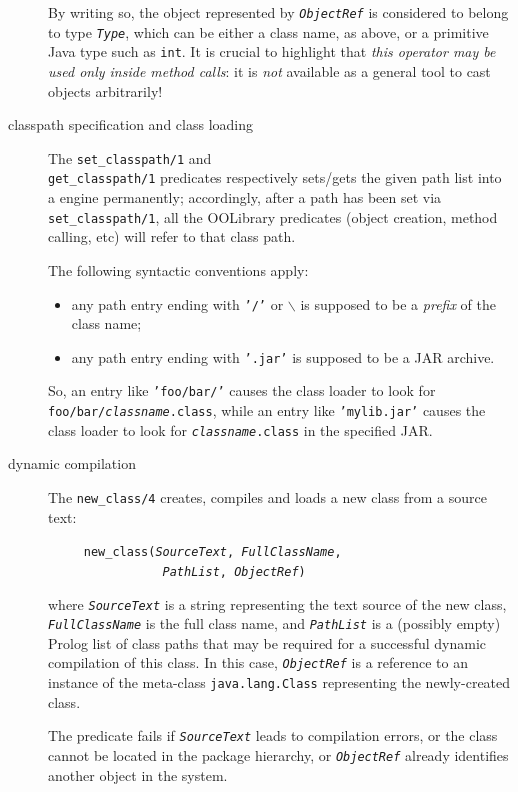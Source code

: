 \begin{description}
        By writing so, the object represented by \texttt{\textit{ObjectRef}} is considered to belong to type \texttt{\textit{Type}}, which can be either a class name, as above, or a primitive Java type such as \texttt{int}.
        It is crucial to highlight that \textit{this operator may be used only inside method calls}: it is \textit{not} available as a general tool to cast objects arbitrarily!

  \item [classpath specification and class loading]

        The \texttt{set\_classpath/1} and\\ \texttt{get\_classpath/1} predicates respectively sets/gets the given path list into a \tuprolog{} engine permanently; accordingly, after a path has been set via \texttt{set\_classpath/1}, all the OOLibrary predicates (object creation, method calling, etc) will refer to that class path.

        The following syntactic conventions apply:
        \begin{itemize}
          \item any path entry ending with \texttt{'/'} or \texttt{$\backslash$} is supposed to be a \textit{prefix} of the class name;
          \item any path entry ending with \texttt{'.jar'} is supposed to be a JAR archive.
        \end{itemize}
        \noindent So, an entry like \texttt{'foo/bar/'} causes the \tuprolog{} class loader to look for \texttt{foo/bar/\textit{classname}.class}, while an entry like \texttt{'mylib.jar'} causes the \tuprolog{} class loader to look for \texttt{\textit{classname}.class} in the specified JAR.

  \item [dynamic compilation]

        The \texttt{new\_class/4} creates, compiles and loads a new class from a source text:

        \texttt{~~~~~new\_class(\textit{SourceText}, \textit{FullClassName},}\\
        \texttt{\mbox{~~~~~~~~~~~~~~~~}\textit{PathList}, \textit{ObjectRef})}

        where \texttt{\textit{SourceText}} is a string representing the text source of the new class, \texttt{\textit{FullClassName}} is the full class name, and \texttt{\textit{PathList}} is a (possibly empty) Prolog list of class paths that may be required for a successful dynamic compilation of this class.
        In this case, \texttt{\textit{ObjectRef}} is a reference to an instance of the meta-class \texttt{java.lang.Class} representing the newly-created class.

        The predicate fails if \texttt{\textit{SourceText}} leads to compilation errors, or the class cannot be located in the package hierarchy, or \texttt{\textit{ObjectRef}} already identifies another object in the system.
\end{description}

